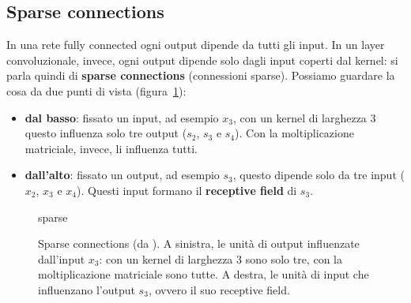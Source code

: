 \subsection{Sparse connections}
In una rete fully connected ogni output dipende da tutti gli input. In un layer convoluzionale, invece, ogni output dipende solo dagli input coperti dal kernel: si parla quindi di \textbf{sparse connections} (connessioni sparse). Possiamo guardare la cosa da due punti di vista (figura~\ref{fig:sparse}):
\begin{itemize}
    \item \textbf{dal basso}: fissato un input, ad esempio $x_3$, con un kernel di larghezza 3 questo influenza solo tre output ($s_2$, $s_3$ e $s_4$). Con la moltiplicazione matriciale, invece, li influenza tutti.
    \item \textbf{dall'alto}: fissato un output, ad esempio $s_3$, questo dipende solo da tre input ($x_2$, $x_3$ e $x_4$). Questi input formano il \textbf{receptive field} di $s_3$.
\end{itemize}

\begin{figure}[htbp]
\centering
\begin{widget}{sparse}
\end{widget}
\caption{Sparse connections (da \cite{Goodfellow-et-al-2016}). A sinistra, le unità di output influenzate dall'input $x_3$: con un kernel di larghezza 3 sono solo tre, con la moltiplicazione matriciale sono tutte. A destra, le unità di input che influenzano l'output $s_3$, ovvero il suo receptive field.}
\label{fig:sparse}
\end{figure}

